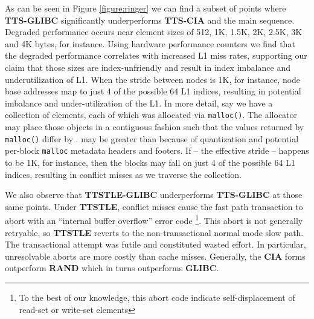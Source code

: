 \documentclass[preprint]{sigplanconf}
\begin{document}
As can be seen in Figure \ref{figure:ringer} we can find a subset of points where 
\textbf{TTS-GLIBC} significantly underperforms \textbf{TTS-CIA} and the main sequence.
Degraded performance occurs near element sizes of 512, 1K, 1.5K, 2K, 2.5K, 3K and 
4K bytes, for instance.  Using hardware performance counters we find that the
degraded performance correlates with increased L1 miss rates, supporting our
claim that those sizes are index-unfriendly and result in index imbalance and
underutilization of L1.  When the stride between nodes is 1K, for instance,
node base addresses map to just 4 of the possible 64 L1 indices, resulting
in potential imbalance and under-utilization of the L1.  In more detail,
say we have a collection of  elements, each of which was allocated via 
\texttt{malloc()}. The allocator may place those  objects in a contiguous
fashion such that the values returned by \texttt{malloc()} differ by .
 may be greater than  because of quantization and potential per-block
\texttt{malloc} metadata headers and footers.   If  -- the effective stride -- 
happens to be 1K, for instance, then the  blocks may fall on just 4 of the 
possible 64 L1 indices, resulting in conflict misses as we traverse the collection. 

We also observe that \textbf{TTSTLE-GLIBC} underperforms
\textbf{TTS-GLIBC} at those same points.  Under \textbf{TTSTLE}, conflict
misses cause the fast path transaction to abort with an ``internal buffer overflow'' 
error code \footnote{To the best of our knowledge, this abort code indicate self-displacement
of read-set or write-set elements}.  
This abort is not generally retryable, so \textbf{TTSTLE} reverts to the 
non-transactional normal mode slow path.  
The transactional attempt was futile and constituted wasted effort.  In particular, 
unresolvable aborts are more costly than cache misses.  Generally,
the \textbf{CIA} forms outperform \textbf{RAND} which in turns outperforms \textbf{GLIBC}.
\end{document}
